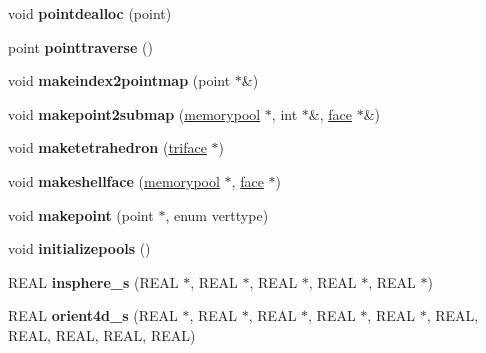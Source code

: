 \begin{DoxyCompactItemize}
\mbox{\label{classtetgenmesh_abafc92933f5d33791abeca5eb0a7cc05}} 
void {\bfseries pointdealloc} (point)
\item 
\mbox{\label{classtetgenmesh_a2b088cf9fa743d47b4520d43d9964087}} 
point {\bfseries pointtraverse} ()
\item 
\mbox{\label{classtetgenmesh_a0a278dbd160df620cfe93fd3eed5e9da}} 
void {\bfseries makeindex2pointmap} (point $\ast$\&)
\item 
\mbox{\label{classtetgenmesh_a20c595345b290a1d08c29e4d3a0e0500}} 
void {\bfseries makepoint2submap} (\hyperlink{classtetgenmesh_1_1memorypool}{memorypool} $\ast$, int $\ast$\&, \hyperlink{classtetgenmesh_1_1face}{face} $\ast$\&)
\item 
\mbox{\label{classtetgenmesh_aa1a1561e6fde22070832ae038976067b}} 
void {\bfseries maketetrahedron} (\hyperlink{classtetgenmesh_1_1triface}{triface} $\ast$)
\item 
\mbox{\label{classtetgenmesh_a98c862e8bb1f1c25e03bb550804028cd}} 
void {\bfseries makeshellface} (\hyperlink{classtetgenmesh_1_1memorypool}{memorypool} $\ast$, \hyperlink{classtetgenmesh_1_1face}{face} $\ast$)
\item 
\mbox{\label{classtetgenmesh_ac6115b981e63664fe06c4a1d4b541737}} 
void {\bfseries makepoint} (point $\ast$, enum verttype)
\item 
\mbox{\label{classtetgenmesh_a0ed29d97e57db7035017c312dc6aaa2f}} 
void {\bfseries initializepools} ()
\item 
\mbox{\label{classtetgenmesh_ae0d6ddfffb8154c7658b8dd17fc51412}} 
R\+E\+AL {\bfseries insphere\+\_\+s} (R\+E\+AL $\ast$, R\+E\+AL $\ast$, R\+E\+AL $\ast$, R\+E\+AL $\ast$, R\+E\+AL $\ast$)
\item 
\mbox{\label{classtetgenmesh_ac73e403159c27dbb3d6cbf99f01925dd}} 
R\+E\+AL {\bfseries orient4d\+\_\+s} (R\+E\+AL $\ast$, R\+E\+AL $\ast$, R\+E\+AL $\ast$, R\+E\+AL $\ast$, R\+E\+AL $\ast$, R\+E\+AL, R\+E\+AL, R\+E\+AL, R\+E\+AL, R\+E\+AL)

\end{DoxyCompactItemize}
